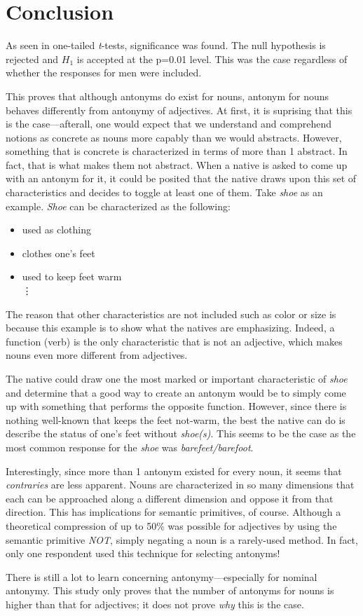 \section {Conclusion}
\label{conclusion}

As seen in one-tailed \textit{t}-tests, significance was found.  The null hypothesis is rejected and $H_{1}$ is accepted at the p=0.01 level.  This was the case regardless of whether the responses for men were included.

This proves that although antonyms do exist for nouns, antonym for nouns behaves differently from antonymy of adjectives.  At first, it is suprising that this is the case---afterall, one would expect that we understand and comprehend notions as concrete as nouns more capably than we would abstracts.  However, something that is concrete is characterized in terms of more than 1 abstract.  In fact, that is what makes them not abstract.  When a native is asked to come up with an antonym for it, it could be posited that the native draws upon this set of characteristics and decides to toggle at least one of them.  Take \textit{shoe} as an example.  \textit{Shoe} can be characterized as the following:

\begin{itemize}
	\item used as clothing
	\item clothes one's feet
	\item used to keep feet warm \\
	\vdots
\end{itemize}

The reason that other characteristics are not included such as color or size is because this example is to show what the natives are emphasizing.  Indeed, a function (verb) is the only characteristic that is not an adjective, which makes nouns even more different from adjectives.

The native could draw one the most marked or important characteristic of \textit{shoe} and determine that a good way to create an antonym would be to simply come up with something that performs the opposite function.  However, since there is nothing well-known that keeps the feet not-warm, the best the native can do is describe the status of one's feet without \textit{shoe(s)}.  This seems to be the case as the most common response for the \textit{shoe} was \textit{barefeet/barefoot}.  

Interestingly, since more than 1 antonym existed for every noun, it seems that \textit{contraries} are less apparent.  Nouns are characterized in so many dimensions that each can be approached along a different dimension and oppose it from that direction.  This has implications for semantic primitives, of course.  Although a theoretical compression of up to 50\% was possible for adjectives by using the semantic primitive \textit{NOT}, simply negating a noun is a rarely-used method.  In fact, only one respondent used this technique for selecting antonyms!

There is still a lot to learn concerning antonymy---especially for nominal antonymy.  This study only proves that the number of antonyms for nouns is higher than that for adjectives; it does not prove \textit{why} this is the case.  